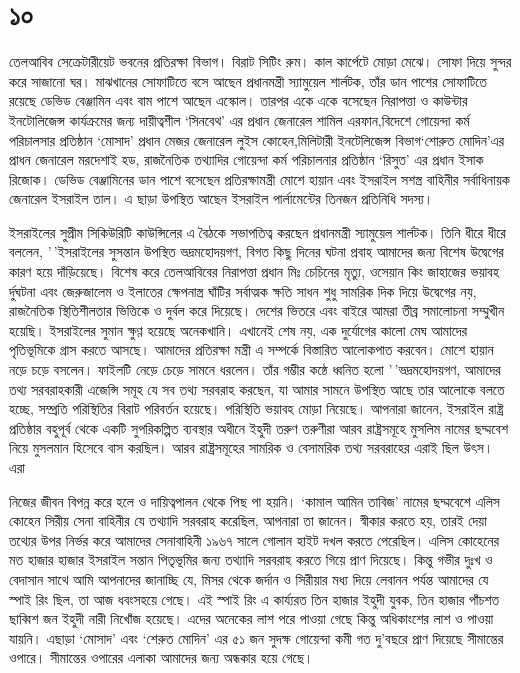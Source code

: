 \documentclass[
]{book}
\begin{document}
\section*{১০}\label{ota-1-10}

তেলআবিব সেক্রেটারীয়েট ভবনের প্রতিরক্ষা বিভাগ। বিরাট সিটিং রুম। কাল কার্পেটে মোড়া মেঝে। সোফা দিয়ে সুন্দর করে সাজানো ঘর। মাঝখানের সোফাটিতে বসে আছেন প্রধানমন্ত্রী স্যামুয়েল শার্লটক, তাঁর ডান পাশের সোফাটিতে রয়েছে ডেভিড বেঞ্জামিন এবং বাম পাশে আছেন এস্কোল। তারপর একে একে বসেছেন নিরাপত্তা ও কাউন্টার ইনটোলিজেন্স কার্যক্রমের জন্য দায়ীত্বশীল `সিনবেথ' এর প্রধান জেনারেল শামিল এরফান,বিদেশে গোয়েন্দা কর্ম পরিচালসার প্রতিষ্ঠান `মোসাদ' প্রধান মেজর জেনারেল লুইস কোহেন,মিলিটারী ইনটেলিজেন্স বিভাগ`শোরুত মোদিন'এর প্রাধন জেনারেল মরদেশাই হড, রাজনৈতিক তথ্যাদির গোয়েন্দা কর্ম পরিচালনার প্রতিষ্ঠান `রিসুত' এর প্রধান ইসাক রিজোক। ডেভিড বেঞ্জামিনের ডান পাশে বসেছেন প্রতিরক্ষামন্ত্রী মোশে হায়ান এবং ইসরাইল সশস্ত্র বাহিনীর সর্বাধিনায়ক জেনারেল ইসরাইল তাল। এ ছাড়া উপস্থিত আছেন ইসরাইল পার্লামেন্টের তিনজন প্রতিনিধি সদস্য।

ইসরাইলের সুপ্রীম সিকিউরিটি কাউন্সিলের এ বৈঠকে সভাপতিত্ব করছেন প্রধানমন্ত্রী স্যামুয়েল শার্লটক। তিনি ধীরে ধীরে বললেন, '\,'ইসরাইলের সুসন্তান উপস্থিত ভদ্রমহোদয়গণ, বিগত কিছু দিনের ঘটনা প্রবাহ আমাদের জন্য বিশেষ উদ্বেগের কারণ হয়ে দাঁড়িয়েছে। বিশেষ করে তেলআবিবের নিরাপত্তা প্রধান মিঃ চেচিনের মৃত্যু, ওসেয়ান কিং জাহাজের ভয়াবহ র্দুঘটনা এবং জেরুজালেম ও ইলাতের ক্ষেপনাস্ত্র ঘাঁটির সর্বাত্মক ক্ষতি সাধন শুধু সামরিক দিক দিয়ে উদ্বেগের নয়, রাজনৈতিক স্থিতিশীলতার ভিত্তিকে ও দুর্বল করে দিয়েছে। দেশের ভিতরে এবং বাইরে আমরা তীব্র সমালোচনা সম্মুখীন হয়েছি। ইসরাইলের সুমান ক্ষুণ্ণ হয়েছে অনেকখানি। এখানেই শেষ নয়, এক দুর্যোগের কালো মেঘ আমাদের পৃতিভূমিকে গ্রাস করতে আসছে। আমাদের প্রতিরক্ষা মন্ত্রী এ সম্পর্কে বিস্তারিত আলোকপাত করবেন। মোশে হায়ান নড়ে চড়ে বসলেন। ফাইলটি নেড়ে চেড়ে সামনে ধরলেন। তাঁর গম্ভীর কন্ঠে ধ্বনিত হলো '\,'ভদ্রমহোদয়গণ, আমাদের তথ্য সরবরাহকারী এজেন্সি সমূহ যে সব তথ্য সরবরাহ করছেন, যা আমার সামনে উপস্থিত আছে তার আলোকে বলতে হচ্ছে, সম্প্রতি পরিস্থিতির বিরাট পরিবর্তন হয়েছে। পরিস্থিতি ভয়াবহ মোড়া নিয়েছে। আপনারা জানেন, ইসরাইল রাষ্ট্র প্রতিষ্ঠার বহুপূর্ব থেকে একটি সুপরিকল্পিত ব্যবস্থার অধীনে ইহুদী তরুণ তরুণীরা আরব রাষ্ট্রসমূহে মুসলিম নামের ছদ্মবেশ নিয়ে মুসলমান হিসেবে বাস করছিল। আরব রাষ্ট্রসমূহের সামরিক ও বেসামরিক তথ্য সরবরাহের এরাই ছিল উৎস। এরা

নিজের জীবন বিপন্ন করে হলে ও দায়িত্বপালন থেকে পিছ পা হয়নি। `কামাল আমিন তাবিজ' নামের ছদ্মবেশে এলিস কোহেন সিরীয় সেনা বাহিনীর যে তথ্যাদি সরবরাহ করেছিল, আপনারা তা জানেন। স্বীকার করতে হয়, তারই দেয়া তথ্যের উপর নির্ভর করে আমাদের সেনাবাহিনী ১৯৬৭ সালে গোলান হাইট দখল করতে পেরেছিল। এলিস কোহেনের মত হাজার হাজার ইসরাইল সন্তান পিতৃভূমির জন্য তথ্যাদি সরবরাহ করতে গিয়ে প্রাণ দিয়েছে। কিন্তু গভীর দুঃখ ও বেদাসান সাথে আমি আপনাদের জানাচ্ছি যে, মিসর থেকে জর্দান ও সিরীয়ার মধ্য দিয়ে লেবানন পর্যন্ত আমাদের যে স্পাই রিং ছিল, তা আজ ধবংসহয়ে গেছে। এই স্পাই রিং এ কার্য্যরত তিন হাজার ইহুদী যুবক, তিন হাজার পাঁচশত ছাব্বিশ জন ইহুদী নারী নিখোঁজ হয়েছে। এদের অনেকের লাশ পরে পাওয়া গেছে কিন্তু অধিকাংশের লাশ ও পাওয়া যায়নি। এছাড়া `মোসাদ' এবং `শেরুত মোদিন' এর ৫১ জন সুদক্ষ গোয়েন্দা কমী গত দু'বছরে প্রাণ দিয়েছে সীমান্তের ওপারে। সীমান্তের ওপারের এলাকা আমাদের জন্য অন্ধকার হয়ে গেছে।
\end{document}
